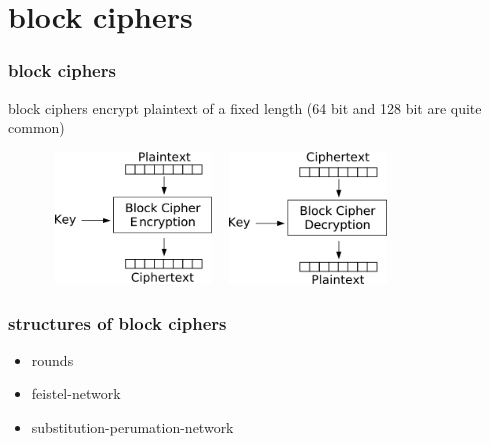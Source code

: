 \section{block ciphers}
\begin{frame}
	\frametitle{block ciphers}
	block ciphers encrypt plaintext of a fixed length (64 bit and 128 bit are quite common)
	\begin{figure}
	 \begin{minipage}[b]{.4\linewidth}
		\includegraphics[width=4.5cm,height=3.5cm]{Encryption}
	 \end{minipage}
	 \hspace{.1\linewidth}
	 \begin{minipage}[b]{.4\linewidth}
		\includegraphics[width=4.5cm,height=3.5cm]{Decryption}
	 \end{minipage}
	\end{figure}
\end{frame}

\begin{frame}
\frametitle{structures of block ciphers}
	\begin{itemize}
		\item rounds
		\item feistel-network
		\item substitution-perumation-network
	\end{itemize}
\end{frame}


